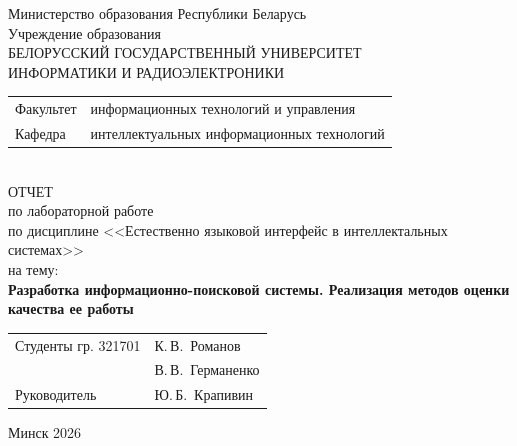 \begin{titlepage}
	\begin{center}
		Министерство образования Республики Беларусь\\[1em]
		Учреждение образования\\
		БЕЛОРУССКИЙ ГОСУДАРСТВЕННЫЙ УНИВЕРСИТЕТ \\
		ИНФОРМАТИКИ И РАДИОЭЛЕКТРОНИКИ\\[1em]
		
		\begin{minipage}{\textwidth}
			\begin{flushleft}
				\begin{tabular}{ l l }
					Факультет & информационных технологий и управления\\
					Кафедра   & интеллектуальных информационных технологий
				\end{tabular}
			\end{flushleft}
		\end{minipage}\\[1em]
		
		
		{ОТЧЕТ}\\
		{по лабораторной работе}\\
		{по дисциплине <<Естественно языковой интерфейс в интеллектальных системах>>}\\
		{на тему:}\\[1em]
		\textbf{\large Разработка информационно-поисковой системы. Реализация методов
		оценки качества ее работы}\\[1em]
		
		
		\vspace{2em}
		\begin{tabular}{ p{}p{} }
			Студенты гр. 321701 & К.\,В.~Романов \\
			& В.\,В.~Германенко \\
			Руководитель & Ю.\,Б.~Крапивин \\

		\end{tabular}
		
		\vfill
		{\normalsize Минск 2026}
	\end{center}
\end{titlepage}
